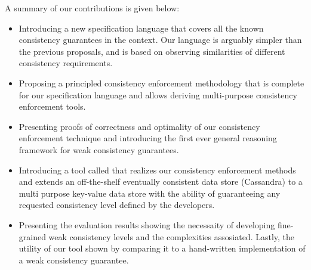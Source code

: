 A summary of our contributions is given below:
\begin{itemize}
\item Introducing a new specification language that covers all the known consistency guarantees in 
the context. Our language is arguably simpler than the previous proposals, and is based on observing 
similarities of different consistency requirements.

\item Proposing a principled consistency enforcement methodology that is 
complete for our specification language and allows deriving multi-purpose consistency enforcement 
tools.

\item Presenting proofs of correctness and optimality of our consistency enforcement technique
and introducing the first ever general reasoning framework for weak consistency guarantees. 

\item Introducing a tool called  \tool that realizes our consistency enforcement methods and 
extends an off-the-shelf eventually consistent data store (Cassandra) to a multi purpose key-value 
data store with the ability of guaranteeing any requested consistency level defined by the 
developers. 

\item Presenting the evaluation results showing the necessaity of
developing fine-grained weak consistency levels and the complexities
assosiated. Lastly, the utility of our tool shown by comparing it to a hand-written
implementation of a weak consistency guarantee. 
\end{itemize}

